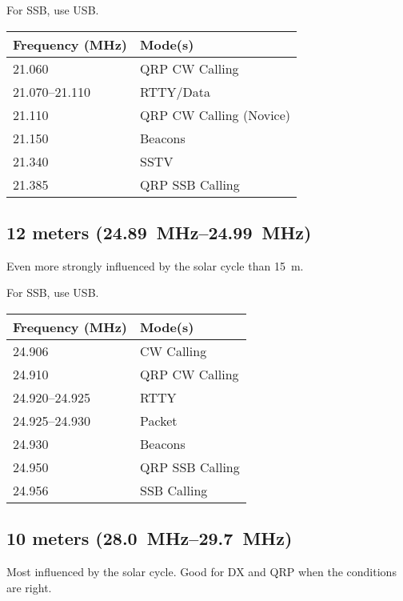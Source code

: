 \documentclass[11pt, onecolumn, table]{article}
\begin{document}
For SSB, use USB.
\begin{center}
  \begin{tabular}{l l}
    {Frequency (\si{\MHz})}		& Mode(s)					\\
    \midrule
    \num{21.060}				& QRP CW Calling			\\
    \numrange{21.070}{21.110}	& RTTY/Data					\\
    \num{21.110}				& QRP CW Calling (Novice)	\\
    \num{21.150}				& Beacons					\\
    \num{21.340}				& SSTV						\\
    \num{21.385}				& QRP SSB Calling			\\
  \end{tabular}
\end{center}


\newpage
\subsection{12 meters (\SIrange{24.89}{24.99}{\MHz})}
Even more strongly influenced by the solar cycle than \SI{15}{m}.

For SSB, use USB.
\begin{center}
  \begin{tabular}{l l}
    {Frequency (\si{\MHz})}			& Mode(s)			\\
    \midrule
    \num{24.906}					& CW Calling		\\
    \num{24.910}					& QRP CW Calling	\\
    \numrange{24.920}{24.925}		& RTTY				\\
    \numrange{24.925}{24.930}		& Packet			\\
    \num{24.930}					& Beacons			\\
    \num{24.950}					& QRP SSB Calling	\\
    \num{24.956}					& SSB Calling		\\
  \end{tabular}
\end{center}


\subsection{10 meters (\SIrange{28.0}{29.7}{\MHz})}
Most influenced by the solar cycle. Good for DX and QRP when
the conditions are right.
\end{document}
